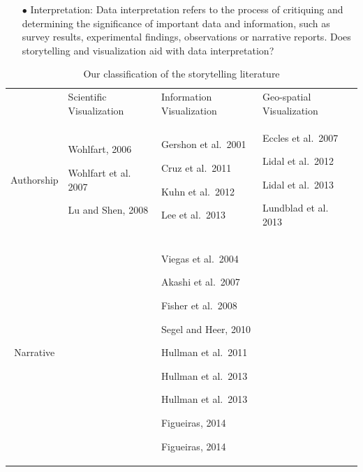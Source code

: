 \documentclass{egpubl}
\begin{document}
\begin{enumerate}
	\item[$\bullet$] Interpretation: Data interpretation refers to the process of critiquing and determining the significance of important data and information, such as survey results, experimental findings, observations or narrative reports. Does storytelling and visualization aid with data interpretation? 
	
\end{enumerate}


\begin{table}[htbp]
\centering
\caption{Our classification of the storytelling literature} 
\centering 
\begin{tabular}{c|| p{4cm}| p{5cm}|p{4cm}} 
 & Scientific Visualization & Information Visualization & Geo-spatial Visualization\\ 
 \hhline{====}
Authorship & Wohlfart, 2006 \cite{wohlfat}\par Wohlfart et al.\, 2007\cite{wohlfart2} \par Lu and Shen, 2008\cite{lu2008interactive} \par & Gershon et al.\, 2001\cite{Gershon2}\par Cruz et al.\, 2011 \cite{cruz2011} \par Kuhn et al.\, 2012\cite{kuhn2012} \par  Lee et al.\, 2013\cite{lee2013} \par & Eccles et al.\, 2007\cite{eccles2007} \par  Lidal et al.\, 2012 \cite{lidal}  \par Lidal et al.\, 2013\cite{Lidal2013} \par Lundblad et al.\, 2013\cite{lundblad2013} \par\\
\hline 
Narrative & & Viegas et al.\, 2004\cite{viegas2004}\par Akashi et al.\, 2007\cite{akaishi2007narrative} \par Fisher et al.\, 2008\cite{fisher} \par Segel and Heer, 2010\cite{segal}\par  Hullman et al.\, 2011\cite{hullman} \par Hullman et al.\, 2013 \cite{hullman2013} \par Hullman et al.\, 2013 \cite{hullman2013deeper} \par Figueiras, 2014 \cite{figueiras} \par Figueiras, 2014 \cite{figueiras2014tell}&\\ 
\hline

\end{tabular}
\end{table}
\end{document}
